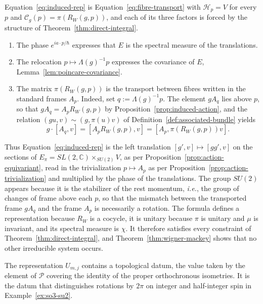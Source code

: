 \begin{remark}\label{rem:induced-reading}
	Equation~\eqref{eq:induced-rep} is Equation~\eqref{eq:fibre-transport} with $\mathcal{H}_p=V$ for every $p$ and $\mathcal{C}_g(p)=\pi(R_W(g,p))$, and each of its three factors is forced by the structure of Theorem~\ref{thm:direct-integral}.
	\begin{enumerate}
		\item The phase $e^{ia\cdot p/\hbar}$ expresses that $E$ is the spectral measure of the translations.
		\item The relocation $p\mapsto\Lambda(g)^{-1}p$ expresses the covariance of $E$, Lemma~\ref{lem:poincare-covariance}.
		\item The matrix $\pi(R_W(g,p))$ is the transport between fibres written in the standard frames $A_p$. Indeed, set $q:=\Lambda(g)^{-1}p$. The element $gA_q$ lies above $p$, so that $gA_q=A_pR_W(g,p)$ by Proposition~\ref{prop:induced-action}, and the relation $(gu,v)\sim(g,\pi(u)v)$ of Definition~\ref{def:associated-bundle} yields
		\begin{equation*}
			g\cdot[A_q,v]=[A_pR_W(g,p),v]=[A_p,\pi(R_W(g,p))v].
		\end{equation*}
	\end{enumerate}
	Thus Equation~\eqref{eq:induced-rep} is the left translation $[g',v]\mapsto[gg',v]$ on the sections of $E_\pi=SL(2,\mathbb{C})\times_{SU(2)}V$, as per Proposition~\ref{prop:action-equivariant}, read in the trivialization $p\mapsto A_p$ as per Proposition~\ref{prop:action-trivialization} and multiplied by the phase of the translations. The group $SU(2)$ appears because it is the stabilizer of the rest momentum, \textit{i.e.}, the group of changes of frame above each $p$, so that the mismatch between the transported frame $gA_q$ and the frame $A_p$ is necessarily a rotation. The formula defines a representation because $R_W$ is a cocycle, it is unitary because $\pi$ is unitary and $\mu$ is invariant, and its spectral measure is $\chi$. It therefore satisfies every constraint of Theorem~\ref{thm:direct-integral}, and Theorem~\ref{thm:wigner-mackey} shows that no other irreducible system occurs.
\end{remark}

The representation $U_{m,j}$ contains a topological datum, the value taken by the element of $\mathcal{P}$ covering the identity of the proper orthochronous isometries. It is the datum that distinguishes rotations by $2\pi$ on integer and half-integer spin in Example~\ref{ex:so3-su2}.

